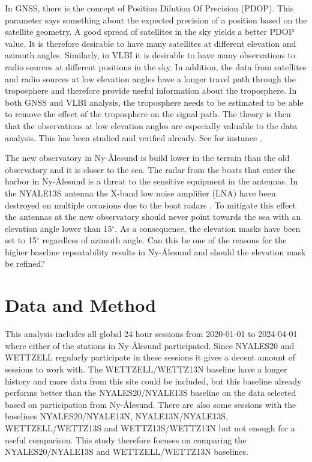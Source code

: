 \documentclass[twoside=semi,fontsize=12pt,paper=a4,titlepage=on]{kv_article}
\begin{document}
In GNSS, there is the concept of Position Dilution Of Precision (PDOP). This parameter says something about the expected precision of a position based on the satellite geometry. A good spread of satellites in the sky yields a better PDOP value. It is therefore desirable to have many satellites at different elevation and azimuth angles. Similarly, in VLBI it is desirable to have many observations to radio sources at different positions in the sky. In addition, the data from satellites and radio sources at low elevation angles have a longer travel path through the troposphere and therefore provide useful information about the troposphere. In both GNSS and VLBI analysis, the troposphere needs to be estimated to be able to remove the effect of the troposphere on the signal path. The theory is then that the observations at low elevation angles are especially valuable to the data analysis. This has been studied and verified already. See for instance \cite{teke2008}. %

The new observatory in Ny-Ålesund is build lower in the terrain than the old observatory and it is closer to the sea. The radar from the boats that enter the harbor in Ny-Ålesund is a threat to the sensitive equipment in the antennas. In the NYALE13S antenna the X-band low noise amplifier (LNA) have been destroyed on multiple occasions due to the boat radars \cite{perez2019}. To mitigate this effect the antennas at the new observatory should never point towards the sea with an elevation angle lower than 15$^\circ$. As a consequence, the elevation masks have been set to 15$^\circ$ regardless of azimuth angle. Can this be one of the reasons for the higher baseline repeatability results in Ny-Ålesund and should the elevation mask be refined?

\section{Data and Method}
\label{sec:data_and_method}
This analysis includes all global 24 hour sessions from 2020-01-01 to 2024-04-01 where either of the stations in Ny-Ålesund participated. Since NYALES20 and WETTZELL regularly participate in these sessions it gives a decent amount of sessions to work with. The WETTZELL/WETTZ13N baseline have a longer history and more data from this site could be included, but this baseline already performs better than the NYALES20/NYALE13S baseline on the data selected based on participation from Ny-Ålesund. There are also some sessions with the baselines NYALES20/NYALE13N, NYALE13N/NYALE13S, WETTZELL/WETTZ13S and WETTZ13S/WETTZ13N but not enough for a useful comparison. This study therefore focuses on comparing the NYALES20/NYALE13S and WETTZELL/WETTZ13N baselines. 
\end{document}
